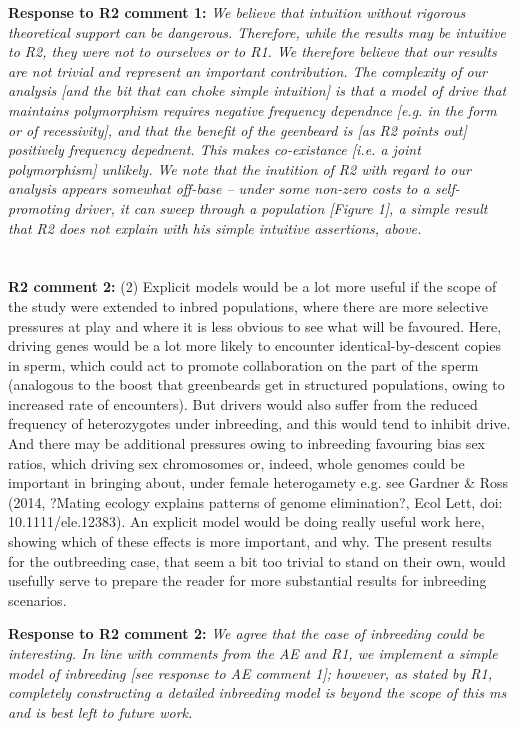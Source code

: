 \documentclass[12pt,letterpaper]{article}
\begin{document}
{\bf{Response to R2 comment 1:}} \emph{We believe that intuition without rigorous theoretical support can be dangerous. Therefore, while the results may be intuitive to R2, they were not to ourselves or to R1. We therefore believe that our results are not trivial and represent an important contribution. The complexity of our analysis [and the bit that can choke simple intuition] is that a model of drive that maintains polymorphism requires negative frequency dependnce [e.g. in the form or of recessivity], and that the benefit of the geenbeard is [as R2 points out] positively frequency depednent. This makes co-existance [i.e. a joint polymorphism] unlikely. We note that the inutition of R2 with regard to our analysis appears somewhat off-base -- under some non-zero costs to a self-promoting driver, it can sweep through a population [Figure 1], a simple result that R2 does not explain with his simple intuitive assertions, above.}
\\
\\
\\
{\bf{R2 comment 2:}} (2) Explicit models would be a lot more useful if the scope of the study were extended to inbred populations, where there are more selective pressures at play and where it is less obvious to see what will be favoured. Here, driving genes would be a lot more likely to encounter identical-by-descent copies in sperm, which could act to promote collaboration on the part of the sperm (analogous to the boost that greenbeards get in structured populations, owing to increased rate of encounters). But drivers would also suffer from the reduced frequency of heterozygotes under inbreeding, and this would tend to inhibit drive. And there may be additional pressures owing to inbreeding favouring bias sex ratios, which driving sex chromosomes or, indeed, whole genomes could be important in bringing about, under female heterogamety e.g. see Gardner \& Ross (2014, ?Mating ecology explains patterns of genome elimination?, Ecol Lett, doi: 10.1111/ele.12383). An explicit model would be doing really useful work here, showing which of these effects is more important, and why. The present results for the outbreeding case, that seem a bit too trivial to stand on their own, would usefully serve to prepare the reader for more substantial results for inbreeding scenarios.

{\bf{Response to R2 comment 2:}} \emph{We agree that the case of inbreeding could be interesting. In line with comments from the AE and R1, we implement a simple model of inbreeding [see response to AE comment 1]; however, as stated by R1, completely constructing a detailed inbreeding model is beyond the scope of this ms and is best left to future work. }
\end{document}
